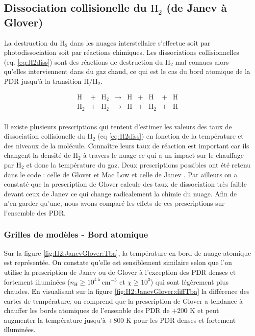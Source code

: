 
\subsection{Dissociation collisionelle du $\mathrm{H}_2$ (de Janev à Glover)}

La destruction du $\mathrm{H}_2$ dans les nuages interstellaire s'effectue soit par photodissociation soit par réactions chimiques. Les dissociations collisionnelles (eq. \ref{eq:H2diss}) sont des réactions de destruction du $\mathrm{H}_2$ mal connues alors qu'elles interviennent dans du gaz chaud, ce qui est le cas du bord atomique de la PDR jusqu'à la transition $\mathrm{H}/\mathrm{H}_2$. 

\begin{equation}\label{eq:H2diss}
    \begin{array}{lcccccccl}
        \mathrm{H} & + & \mathrm{H}_2   & \rightarrow &\mathrm{H}  & + & \mathrm{H} & + & \mathrm{H} \\
        \mathrm{H}_2  & + & \mathrm{H}_2  & \rightarrow & \mathrm{H} & + &\mathrm{H}_2  & + & \mathrm{H} \\
    \end{array}
\end{equation}

Il existe plusieurs prescriptions qui tentent d'estimer les valeurs des taux de dissociation collisionelle du $\mathrm{H}_2$ (eq \ref{eq:H2diss}) en fonction de la température et des niveaux de la molécule. Connaître leurs taux de réaction est important car ils changent la densité de $\mathrm{H}_2$ à travers le nuage ce qui a un impact sur le chauffage par $\mathrm{H}_2$ et donc la température du gaz. Deux prescriptions possibles ont été retenu dans le code : celle de Glover et Mac Low \cite{GloverMacLow_2007} et celle de Janev \cite{Janev2003}. Par ailleurs on a constaté que la prescription de Glover calcule des taux de dissociation très faible devant ceux de Janev ce qui change radicalement la chimie du nuage. Afin de n'en garder qu'une, nous avons comparé les effets de ces prescriptions sur l'ensemble des PDR. \newline 

\subsubsection{Grilles de modèles - Bord atomique}

Sur la figure \ref{fig:H2:JanevGlover:Tba}, la température en bord de nuage atomique est représentée. On constate qu'elle est sensiblement similaire selon que l'on utilise la prescription de Janev ou de Glover à l'exception des PDR denses et fortement illuminées ($n_\mathrm{H} \geq 10^{4.5} \, \mathrm{cm}^{-3}$ et $\chi \geq 10^3$) qui sont légèrement plus chaudes. En visualisant sur la figure \ref{fig:H2:JanevGlover:diffTba} la différence des cartes de température, on comprend que la prescription de Glover a tendance à chauffer les bords atomiques de l'ensemble des PDR de $+200$ K et peut augmenter la température jusqu'à $+800$ K pour les PDR denses et fortement illuminées. \newline


